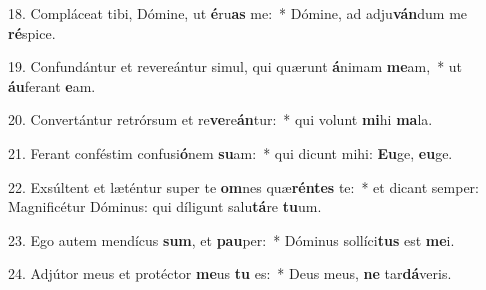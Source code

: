 18. Compláceat tibi, Dómine, ut \textbf{é}ru\textbf{as} me:~*  Dómine, ad adju\textbf{ván}dum me \textbf{ré}spice.\

19. Confundántur et revereántur simul, qui quærunt \textbf{á}nimam \textbf{me}am,~*  ut \textbf{áu}ferant \textbf{e}am.\

20. Convertántur retrórsum et re\textbf{ve}re\textbf{án}tur:~*  qui volunt \textbf{mi}hi \textbf{ma}la.\

21. Ferant conféstim confusi\textbf{ó}nem \textbf{su}am:~*  qui dicunt mihi: \textbf{Eu}ge, \textbf{eu}ge.\

22. Exsúltent et læténtur super te \textbf{om}nes quæ\textbf{rén}\textbf{tes} te:~*  et dicant semper: Magnificétur Dóminus: qui díligunt salu\textbf{tá}re \textbf{tu}um.\

23. Ego autem mendícus \textbf{sum}, et \textbf{pau}per:~*  Dóminus sollíci\textbf{tus} est \textbf{me}i.\

24. Adjútor meus et protéctor \textbf{me}us \textbf{tu} es:~*  Deus meus, \textbf{ne} tar\textbf{dá}veris.\


